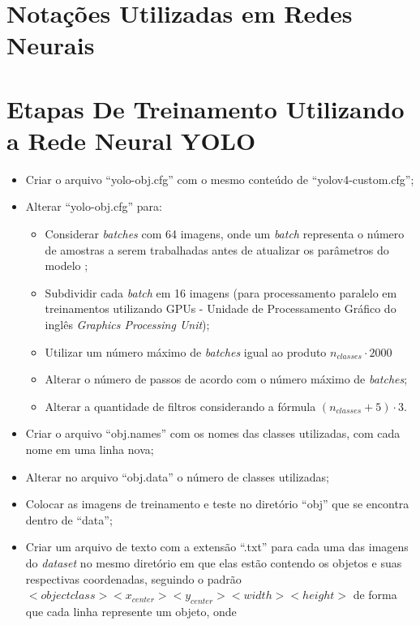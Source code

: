 \chapter{Notações Utilizadas em Redes Neurais} \label{apendice:notacao}



\chapter{Etapas De Treinamento Utilizando a Rede Neural YOLO } \label{apendice:etapas-yolo}
\begin{itemize}
  \item Criar o arquivo ``yolo-obj.cfg'' com o mesmo conteúdo de ``yolov4-custom.cfg'';
  \item Alterar ``yolo-obj.cfg'' para:
  \begin{itemize}
    \item Considerar \textit{batches} com 64 imagens, onde um \textit{batch} representa o número de amostras a serem trabalhadas antes de atualizar os parâmetros do modelo \cite{ref:Brownlee};
    \item Subdividir cada \textit{batch} em 16 imagens (para processamento paralelo em treinamentos utilizando GPUs - Unidade de Processamento Gráfico do inglês \textit{Graphics Processing Unit});
    \item Utilizar um número máximo de \textit{batches} igual ao produto $n_{classes} \cdot 2000$
    \item Alterar o número de passos de acordo com o número máximo de \textit{batches};
    \item Alterar a quantidade de filtros considerando a fórmula $(n_{classes} + 5) \cdot 3$.
  \end{itemize}
  \item Criar o arquivo ``obj.names'' com os nomes das classes utilizadas, com cada nome em uma linha nova;
  \item Alterar no arquivo ``obj.data'' o número de classes utilizadas;
  \item Colocar as imagens de treinamento e teste no diretório ``obj'' que se encontra dentro de ``data'';
  \item Criar um arquivo de texto com a extensão ``.txt'' para cada uma das imagens do \textit{dataset} no mesmo diretório em que elas estão contendo os objetos e suas respectivas coordenadas, seguindo o padrão  $<objectclass> <x_{center}> <y_{center}> <width> <height>$ de forma que cada linha represente um objeto, onde

\end{itemize}
